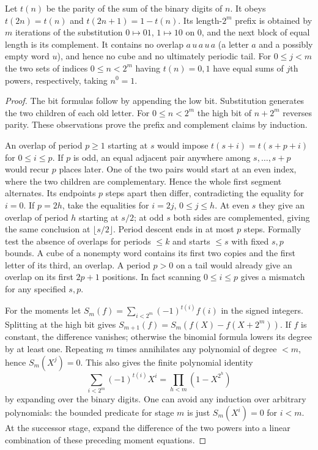 \begin{theorem}\label{result68}\label{thm:tm}
Let $t(n)$ be the parity of the sum of the binary digits of $n$. It obeys $t(2n)=t(n)$ and $t(2n+1)=1-t(n)$. Its length-$2^m$ prefix is obtained by $m$ iterations of the substitution $0\mapsto01$, $1\mapsto10$ on $0$, and the next block of equal length is its complement. It contains no overlap $a\,u\,a\,u\,a$ (a letter $a$ and a possibly empty word $u$), and hence no cube and no ultimately periodic tail. For $0\le j<m$ the two sets of indices $0\le n<2^m$ having $t(n)=0,1$ have equal sums of $j$th powers, respectively, taking $n^0=1$.
\end{theorem}
\begin{proof}
The bit formulas follow by appending the low bit. Substitution generates the two children of each old letter. For $0\le n<2^m$ the high bit of $n+2^m$ reverses parity. These observations prove the prefix and complement claims by induction.

An overlap of period $p\ge1$ starting at $s$ would impose $t(s+i)=t(s+p+i)$ for $0\le i\le p$. If $p$ is odd, an equal adjacent pair anywhere among $s,\ldots,s+p$ would recur $p$ places later. One of the two pairs would start at an even index, where the two children are complementary. Hence the whole first segment alternates. Its endpoints $p$ steps apart then differ, contradicting the equality for $i=0$. If $p=2h$, take the equalities for $i=2j$, $0\le j\le h$. At even $s$ they give an overlap of period $h$ starting at $s/2$; at odd $s$ both sides are complemented, giving the same conclusion at $\lfloor s/2\rfloor$. Period descent ends in at most $p$ steps. Formally test the absence of overlaps for periods $\le k$ and starts $\le s$ with fixed $s,p$ bounds. A cube of a nonempty word contains its first two copies and the first letter of its third, an overlap. A period $p>0$ on a tail would already give an overlap on its first $2p+1$ positions. In fact scanning $0\le i\le p$ gives a mismatch for any specified $s,p$.

For the moments let $S_m(f)=\sum_{i<2^m}(-1)^{t(i)}f(i)$ in the signed integers. Splitting at the high bit gives $S_{m+1}(f)=S_m(f(X)-f(X+2^m))$. If $f$ is constant, the difference vanishes; otherwise the binomial formula lowers its degree by at least one. Repeating $m$ times annihilates any polynomial of degree $<m$, hence $S_m(X^j)=0$. This also gives the finite polynomial identity
\[
 \sum_{i<2^m}(-1)^{t(i)}X^i=\prod_{h<m}(1-X^{2^h})
\]
by expanding over the binary digits. One can avoid any induction over arbitrary polynomials: the bounded predicate for stage $m$ is just $S_m(X^i)=0$ for $i<m$. At the successor stage, expand the difference of the two powers into a linear combination of these preceding moment equations.
\end{proof}

